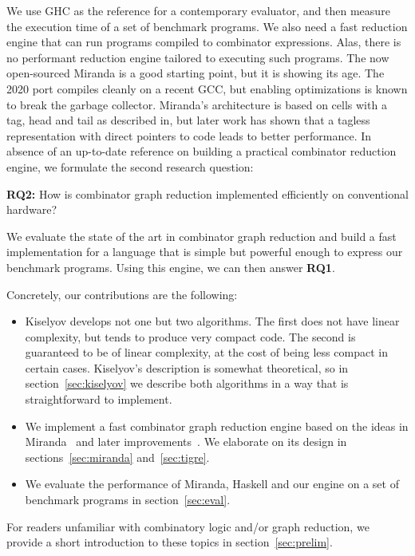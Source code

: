\documentclass[conference]{IEEEtran}
\begin{document}
We use GHC as the reference for a contemporary evaluator, and then measure the execution time of a set of benchmark programs.
We also need a fast reduction engine that can run programs compiled to combinator expressions.
Alas, there is no performant reduction engine tailored to executing such programs.
The now open-sourced Miranda is a good starting point, but it is showing its age.
The 2020 port compiles cleanly on a recent GCC, but enabling optimizations is known to break the garbage collector.
Miranda's architecture is based on cells with a tag, head and tail as described in\cite{turner_new_1979}, but later work has shown that a tagless representation with direct pointers to code leads to better performance\cite{koopman_fresh_1989}.
In absence of an up-to-date reference on building a practical combinator reduction engine, we formulate the second research question:

\textbf{RQ2:} How is combinator graph reduction implemented efficiently on conventional hardware?

We evaluate the state of the art in combinator graph reduction and build a fast implementation for a language that is simple but powerful enough to express our benchmark programs.
Using this engine, we can then answer \textbf{RQ1}.

Concretely, our contributions are the following:
\begin{itemize}
    \item Kiselyov develops not one but two algorithms. The first does not have linear complexity, but tends to produce very compact code.
          The second is guaranteed to be of linear complexity, at the cost of being less compact in certain cases.
          Kiselyov's description is somewhat theoretical, so in section~\ref{sec:kiselyov} we describe both algorithms in a way that is straightforward to implement.
    \item We implement a fast combinator graph reduction engine based on the ideas in Miranda~\cite{turner_miranda_1985} and later improvements~\cite{koopman_architecture_1992}.
          We elaborate on its design in sections~\ref{sec:miranda} and~\ref{sec:tigre}.
    \item We evaluate the performance of Miranda, Haskell and our engine on a set of benchmark programs in section~\ref{sec:eval}.
\end{itemize}

For readers unfamiliar with combinatory logic and/or graph reduction, we provide a short introduction to these topics in section~\ref{sec:prelim}.
\end{document}
